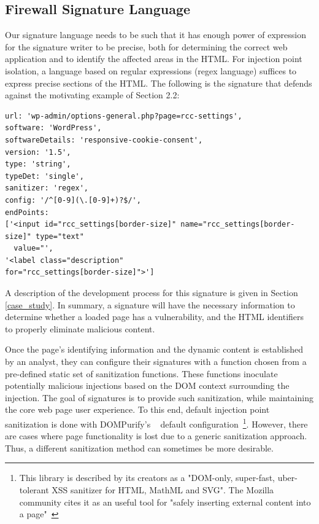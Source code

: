  \subsection{Firewall Signature Language} \label{signature_language}
 Our signature language needs to be such that it has enough power of expression for the signature writer to be precise, both for determining the correct web application and to identify the affected areas in the HTML. For injection point isolation, a language based on regular expressions (regex language) suffices to express precise sections of the HTML. The following is the signature that defends against the motivating example of Section 2.2:
\begin{lstlisting}[breaklines=true,caption={An \sys signature},label={lst:xsnare_signature}]
url: 'wp-admin/options-general.php?page=rcc-settings',
software: 'WordPress',
softwareDetails: 'responsive-cookie-consent',
version: '1.5',
type: 'string',
typeDet: 'single',
sanitizer: 'regex',
config: '/^[0-9](\.[0-9]+)?$/',
endPoints: 
['<input id="rcc_settings[border-size]" name="rcc_settings[border-size]" type="text"
  value="',
'<label class="description" 
for="rcc_settings[border-size]">']
\end{lstlisting}

A description of the development process for this signature is given in Section \ref{case_study}. In summary, a signature will have the necessary information to determine whether a loaded page has a vulnerability, and the HTML identifiers to properly eliminate malicious content.
  
Once the page's identifying information and the dynamic content is established by an analyst, they can configure their signatures with a function chosen from a pre-defined static set of sanitization functions. These functions inoculate potentially malicious injections based on the DOM context surrounding the injection. The goal of signatures is to provide such sanitization, while maintaining the core web page user experience. To this end, default injection point sanitization is done with DOMPurify's  ~\cite{10.1007/978-3-319-66399-9_7} default configuration~\footnote{This library is described by its creators as a "DOM-only, super-fast, uber-tolerant XSS sanitizer for HTML, MathML and SVG". The Mozilla community cites it as an useful tool for "safely inserting external content into a page"~\cite{safecontent}}. However, there are cases where page functionality is lost due to a generic sanitization approach. Thus, a different sanitization method can sometimes be more desirable.
  

